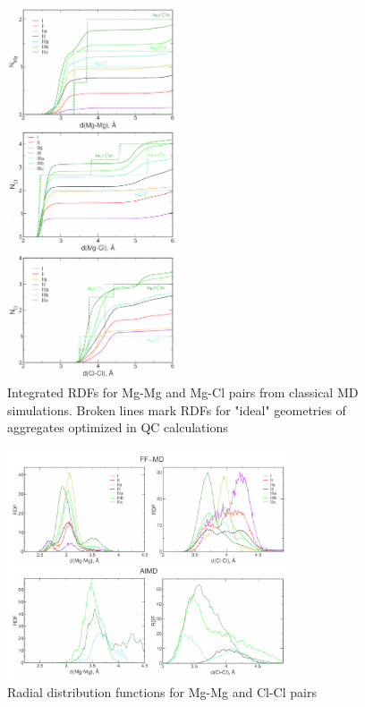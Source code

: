 \begin{figure}[ht]
    \centering
    \includegraphics[width=0.45\textwidth]{img/3-structural-data-from-md-simulations/3-mg-cl-dme/rdf-int-mg-cl.png}
    \caption{Integrated RDFs for Mg-Mg and Mg-Cl pairs from classical MD simulations. Broken lines mark RDFs for "ideal" geometries of aggregates optimized in QC calculations}
    \label{fig:mg-cl-dme-rdf-int-mg-cl}
\end{figure}

\begin{figure}
    \centering
    \includegraphics[width=0.75\textwidth]{img/3-structural-data-from-md-simulations/3-mg-cl-dme/rdf-mg-mg-cl-cl.png}
    \caption{Radial distribution functions for Mg-Mg and Cl-Cl pairs}
    \label{fig:mg-cl-dme-rdf-mg-mg-cl-cl}
\end{figure}

